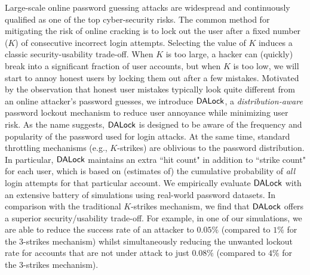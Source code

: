 Large-scale online password guessing attacks are widespread and continuously qualified as one of the top cyber-security risks. The common method for mitigating the risk of online cracking is to lock out the user after a fixed number ($K$) of consecutive incorrect login attempts. Selecting the value of $K$ induces a classic security-usability trade-off. When $K$ is too large, a hacker can (quickly) break into a significant fraction of user accounts, but when $K$ is too low, we will start to annoy honest users by locking them out after a few mistakes. Motivated by the observation that honest user mistakes typically look quite different from an online attacker's password guesses, we introduce $\mathsf{DALock}$, a {\em distribution-aware} password lockout mechanism to reduce user annoyance while minimizing user risk. As the name suggests, $\mathsf{DALock}$ is designed to be aware of the frequency and popularity of the password used for login attacks. At the same time, standard throttling mechanisms (e.g., $K$-strikes) are oblivious to the password distribution. In particular, $\mathsf{DALock}$ maintains an extra ``hit count" in addition to ``strike count" for each user, which is based on (estimates of) the cumulative probability of {\em all} login attempts for that particular account. We empirically evaluate $\mathsf{DALock}$ with an extensive battery of simulations using real-world password datasets. In comparison with the traditional $K$-strikes mechanism, we find that $\mathsf{DALock}$ offers a superior security/usability trade-off. For example, in one of our simulations, we are able to reduce the success rate of an attacker to $0.05\%$ (compared to $1\%$ for the $3$-strikes mechanism) whilst simultaneously reducing the unwanted lockout rate for accounts that are not under attack to just $0.08\%$ (compared to $4\%$ for the $3$-strikes mechanism).  